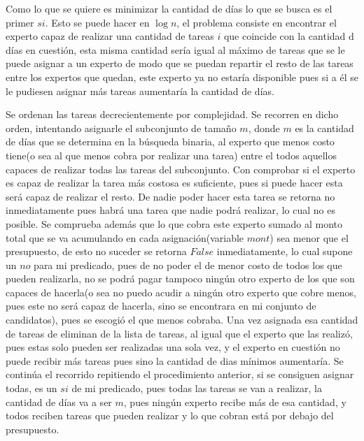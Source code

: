 \documentclass[10pt,letterpaper]{article}
\begin{document}
{ 	Como lo que se quiere es minimizar la cantidad de d\'ias lo que se busca es el primer $si$. Esto se puede hacer en $\log n$, el problema consiste en encontrar el experto capaz de realizar una cantidad de tareas $i$ que coincide con la cantidad d d\'ias en cuesti\'on, esta misma cantidad ser\'ia igual al m\'aximo de tareas que se le puede asignar a un experto de modo que se puedan repartir el resto de las tareas entre los expertos que quedan, este experto ya no estar\'ia disponible pues si a \'el se le pudiesen asignar m\'as tareas aumentar\'ia la cantidad de d\'ias. 
 	
 	Se ordenan las tareas decrecientemente por complejidad. Se recorren en dicho orden, intentando asignarle el subconjunto de tama\~no $m$, donde $m$ es la cantidad de d\'ias que se determina en la b\'usqueda binaria, al experto que menos costo tiene(o sea al que menos cobra por realizar una tarea) entre el todos aquellos capaces de realizar todas las tareas del subconjunto. Con comprobar si el experto es capaz de realizar la tarea m\'as costosa es suficiente, pues si puede hacer esta ser\'a capaz de realizar el resto. De nadie poder hacer esta tarea se retorna no inmediatamente pues habr\'a una tarea que nadie podr\'a realizar, lo cual no es posible. Se comprueba adem\'as que lo que cobra este experto sumado al monto total que se va acumulando en cada asignaci\'on(variable $mont$) sea menor que el presupuesto, de esto no suceder se retorna $False$ inmediatamente, lo cual supone un $no$ para mi predicado, pues de no poder el de menor costo de todos los que pueden realizarla, no se podr\'a pagar tampoco ning\'un otro experto de los que son capaces de hacerla(o sea no puedo acudir a ning\'un otro experto que cobre menos, pues este no ser\'a capaz de hacerla, sino se encontrara en mi conjunto de candidatos), pues se escogi\'o el que menos cobraba. Una vez asignada esa cantidad de tareas de eliminan de la lista de tareas, al igual que el experto que las realiz\'o, pues estas solo pueden ser realizadas una sola vez, y el experto en cuesti\'on no puede recibir m\'as tareas pues sino la cantidad de dias m\'inimos aumentar\'ia. Se contin\'ua el recorrido repitiendo el procedimiento anterior, si se consiguen asignar todas, es un $si$ de mi predicado, pues todas las tareas se van a realizar, la cantidad de d\'ias va a ser $m$, pues ning\'un experto recibe m\'as de esa cantidad, y todos reciben tareas que pueden realizar y lo que cobran est\'a por debajo del presupuesto.\\ \\
 	
}
\end{document}
